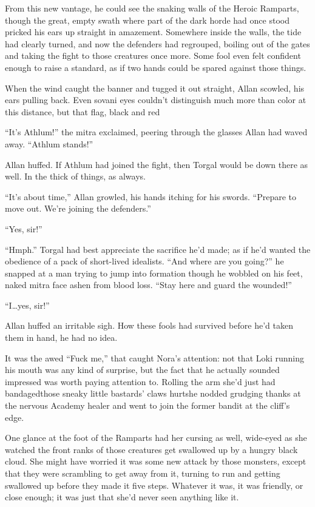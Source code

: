 From this new vantage, he could see the snaking walls of the Heroic Ramparts, though the great, empty swath where part of the dark horde had once stood pricked his ears up straight in amazement. Somewhere inside the walls, the tide had clearly turned, and now the defenders had regrouped, boiling out of the gates and taking the fight to those creatures once more. Some fool even felt confident enough to raise a standard, as if two hands could be spared against those things.

When the wind caught the banner and tugged it out straight, Allan scowled, his ears pulling back. Even sovani eyes couldn't distinguish much more than color at this distance, but that flag, black and red\textemdash 

``It's Athlum!'' the mitra exclaimed, peering through the glasses Allan had waved away. ``Athlum stands!''

Allan huffed. If Athlum had joined the fight, then Torgal would be down there as well. In the thick of things, as always.

``It's about time,'' Allan growled, his hands itching for his swords. ``Prepare to move out. We're joining the defenders.''

``Yes, sir!''

``Hmph.'' Torgal had best appreciate the sacrifice he'd made; as if he'd wanted the obedience of a pack of short-lived idealists. ``And where are you going?'' he snapped at a man trying to jump into formation though he wobbled on his feet, naked mitra face ashen from blood loss. ``Stay here and guard the wounded!''

``I\ldots yes, sir!''

Allan huffed an irritable sigh. How these fools had survived before he'd taken them in hand, he had no idea.


\scenechange


It was the awed ``Fuck me,'' that caught Nora's attention: not that Loki running his mouth was any kind of surprise, but the fact that he actually sounded impressed was worth paying attention to. Rolling the arm she'd just had bandaged\textemdash those sneaky little bastards' claws hurt\textemdash she nodded grudging thanks at the nervous Academy healer and went to join the former bandit at the cliff's edge.

One glance at the foot of the Ramparts had her cursing as well, wide-eyed as she watched the front ranks of those creatures get swallowed up by a hungry black cloud. She might have worried it was some new attack by those monsters, except that they were scrambling to get away from it, turning to run and getting swallowed up before they made it five steps. Whatever it was, it was friendly, or close enough; it was just that she'd never seen anything like it.

